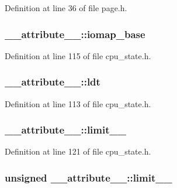 \-Definition at line 36 of file page.\-h.

\hypertarget{struct____attribute_____a5228df8e4eb33e10e2dd05d6cbfbab26}{
\subsubsection[{iomap\-\_\-base}]{ {\bf \-\_\-\-\_\-attribute\-\_\-\-\_\-\-::iomap\-\_\-base}}}\label{struct____attribute_____a5228df8e4eb33e10e2dd05d6cbfbab26}


\-Definition at line 115 of file cpu\-\_\-state.\-h.

\hypertarget{struct____attribute_____a8f61cbe40cec1e93af25c2ba4282e5bc}{
\subsubsection[{ldt}]{ {\bf \-\_\-\-\_\-attribute\-\_\-\-\_\-\-::ldt}}}\label{struct____attribute_____a8f61cbe40cec1e93af25c2ba4282e5bc}


\-Definition at line 113 of file cpu\-\_\-state.\-h.

\hypertarget{struct____attribute_____a55bf8f9dcb94b2f78266c6eb69ead199}{
\subsubsection[{limit\-\_\-0\-\_\-15}]{ {\bf \-\_\-\-\_\-attribute\-\_\-\-\_\-\-::limit\-\_\-\_}}}\label{struct____attribute_____a55bf8f9dcb94b2f78266c6eb69ead199}


\-Definition at line 121 of file cpu\-\_\-state.\-h.

\hypertarget{struct____attribute_____af7873c579f5da8ab8376c9f70f33a724}{
\subsubsection[{limit\-\_\-16\-\_\-19}]{\setlength{\rightskip}{0pt plus 5cm}unsigned {\bf \-\_\-\-\_\-attribute\-\_\-\-\_\-\-::limit\-\_\-\_}}}\label{struct____attribute_____af7873c579f5da8ab8376c9f70f33a724}


